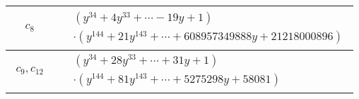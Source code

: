 \documentclass[1p]{elsarticle_modified}
\theoremstyle{definition}
\begin{document}
\begin{tabular}{m{50pt}|m{274pt}}
\hline $$\begin{aligned}c_{8}\end{aligned}$$&$\begin{aligned}
&(y^{34}+4 y^{33}+\cdots-19 y+1)\\
&\cdot(y^{144}+21 y^{143}+\cdots+608957349888 y+21218000896)
\end{aligned}$\\
\hline $$\begin{aligned}c_{9},c_{12}\end{aligned}$$&$\begin{aligned}
&(y^{34}+28 y^{33}+\cdots+31 y+1)\\
&\cdot(y^{144}+81 y^{143}+\cdots+5275298 y+58081)
\end{aligned}$\\
\hline
\end{tabular}
\vskip 2pc
\end{document}
